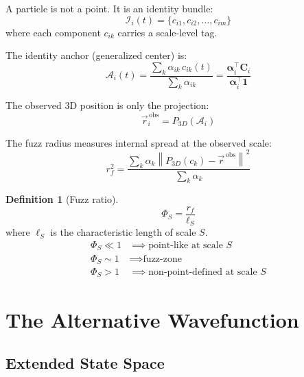 \documentclass[11pt, a4paper, oneside]{article}
\theoremstyle{definition}
\newtheorem{definition}{Definition}[section]
\theoremstyle{plain}
\theoremstyle{remark}
\begin{document}
A particle is not a point. It is an identity bundle:
\begin{equation}
  \mathcal{I}_i(t) = \{c_{i1}, c_{i2}, \ldots, c_{im}\}
  \label{eq:identity-bundle}
\end{equation}
where each component $c_{ik}$ carries a scale-level tag.

The identity anchor (generalized center) is:
\begin{equation}
  \mathcal{A}_i(t)
  = \frac{\sum_k \alpha_{ik}\, c_{ik}(t)}{\sum_k \alpha_{ik}}
  = \frac{\bm{\alpha}_i^\top \mathbf{C}_i}{\bm{\alpha}_i^\top \mathbf{1}}
  \label{eq:anchor}
\end{equation}

The observed 3D position is only the projection:
\begin{equation}
  \vec{r}_i^{\,\text{obs}} = P_{3D}\!\left(\mathcal{A}_i\right)
\end{equation}

The fuzz radius measures internal spread at the observed scale:
\begin{equation}
  r_f^2 =
  \frac{\sum_k \alpha_k \left\|P_{3D}(c_k) - \vec{r}^{\,\text{obs}}\right\|^2}
	   {\sum_k \alpha_k}
  \label{eq:fuzz-radius}
\end{equation}

\begin{definition}[Fuzz ratio]
  \begin{equation}
	\Phi_S = \frac{r_f}{\ell_S}
  \end{equation}
  where $\ell_S$ is the characteristic length of scale $S$.
  \begin{align*}
	\Phi_S \ll 1 &\implies \text{point-like at scale } S \\
	\Phi_S \sim 1 &\implies \text{fuzz-zone} \\
	\Phi_S > 1  &\implies \text{non-point-defined at scale } S
  \end{align*}
\end{definition}

\section{The Alternative Wavefunction}

\subsection{Extended State Space}
\end{document}
